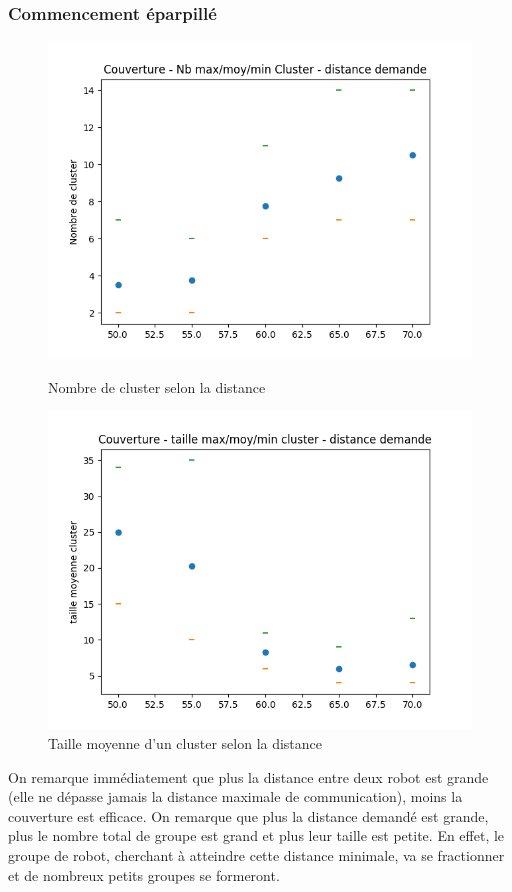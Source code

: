 \documentclass[a4paper]{article}
\begin{document}
\subsubsection{Commencement éparpillé}
\begin{figure}[h]
	\begin{minipage}[c]{.46\linewidth}
		\centering
		\includegraphics[width=1.1\linewidth]{../../script_results/Couverture_average_robot.png}
		\caption{Nombre de cluster selon la distance}
	\end{minipage}
	\hfill%
	\begin{minipage}[c]{.46\linewidth}
		\centering
		\includegraphics[width=1.1\linewidth]{../../script_results/Couverture_taille_cluster.png}
		\caption{Taille moyenne d'un cluster selon la distance}
	\end{minipage}
\end{figure}
On remarque immédiatement que plus la distance entre deux robot est grande (elle ne dépasse jamais la distance maximale de communication), moins la couverture est efficace. On remarque que plus la distance demandé est grande, plus le nombre total de groupe est grand et plus leur taille est petite. En effet, le groupe de robot, cherchant à atteindre cette distance minimale, va se fractionner et de nombreux petits groupes se formeront. 
\end{document}
